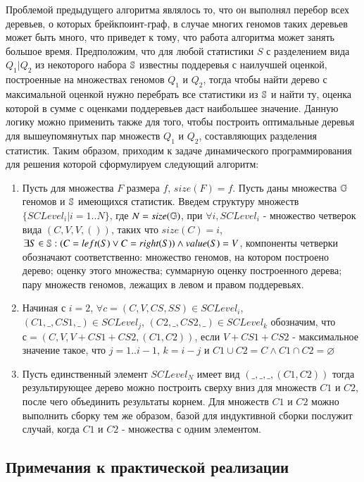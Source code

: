Проблемой предыдущего алгоритма являлось то, что он выполнял перебор всех деревьев, о которых  брейкпоинт-граф,
в случае многих геномов таких деревьев может быть много, что приведет к тому, что работа алгоритма может занять большое время.
Предположим, что для любой статистики $S$ с разделением вида $Q_1|Q_2$ из некоторого набора $\mathbb{S}$ известны поддеревья с наилучшей оценкой,
построенные на множествах геномов $Q_1$ и $Q_2$, тогда чтобы найти дерево с максимальной оценкой нужно перебрать все статистики из $\mathbb{S}$ и найти ту,
оценка которой в сумме с оценками поддеревьев даст наибольшее значение.
Данную логику можно применить также для того, чтобы построить оптимальные деревья для вышеупомянутых пар множеств $Q_1$ и $Q_2$,
составляющих разделения статистик.
Таким образом, приходим к задаче динамического программирования для решения которой сформулируем следующий алгоритм:
\begin{enumerate}
  \item Пусть для множества $F$ размера $f$, $size(F) = f$.
    Пусть даны множества $\mathbb{G}$ геномов и $\mathbb{S}$ имеющихся статистик.
    Введем структуру множеств $\{ SCLevel_i | i = 1..N \}$, где $N = size(\mathbb{G})$,
    при $\forall i, SCLevel_i$ - множество четверок вида $(C, V, V, ())$, таких что $size(C) = i$,
    $\exists S \in \mathbb{S}: (C = left(S) \vee C = right(S)) \wedge value(S) = V$,
    компоненты четверки обозначают соответственно: множество геномов, на котором построено дерево;
    оценку этого множества; суммарную оценку построенного дерева; пару множеств геномов, лежащих в левом и правом поддеревьях.
  \item Начиная с $i = 2$,
    $\forall c = (C, V, CS, SS) \in SCLevel_i$,
    $(C1, \_, CS1, \_) \in SCLevel_j$,
    $(C2, \_, CS2, \_) \in SCLevel_k$ обозначим, что $с = (C, V, V + CS1 + CS2, (C1, C2))$,
    если $V + CS1 + CS2$ - максимальное значение такое, что $j = 1..i-1$, $k = i - j$ и $C1 \cup C2 = C \wedge C1 \cap C2 = \varnothing$
  \item Пусть единственный элемент $SCLevel_N$ имеет вид $(\_, \_, \_, (C1, C2))$ тогда результирующее дерево можно построить сверху
    вниз для множеств $C1$ и $C2$, после чего объединить результаты корнем.
    Для множеств $C1$ и $C2$ можно выполнить сборку тем же образом, базой для индуктивной сборки послужит случай,
    когда $C1$ и $C2$ - множества с одним элементом.
\end{enumerate}

\subsection{Примечания к практической реализации}

